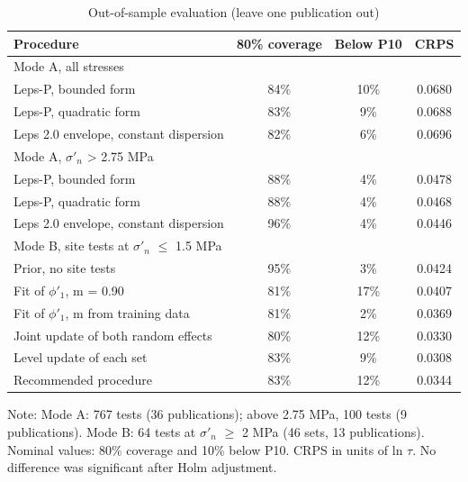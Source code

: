 \documentclass[Journal,letterpaper]{ascelike-new}
\begin{document}
\begin{table}
\caption{Out-of-sample evaluation (leave one publication out)}
\label{tab:2}
\centering\small
\renewcommand{\arraystretch}{1.15}
\begin{tabular}{lccc}
\hline\hline
Procedure & 80\% coverage & Below P10 & CRPS \\
\hline
Mode A, all stresses &  &  &  \\
   Leps-P, bounded form & 84\% & 10\% & 0.0680 \\
   Leps-P, quadratic form & 83\% & 9\% & 0.0688 \\
   Leps 2.0 envelope, constant dispersion & 82\% & 6\% & 0.0696 \\
Mode A, $\sigma'_n$ > 2.75 MPa &  &  &  \\
   Leps-P, bounded form & 88\% & 4\% & 0.0478 \\
   Leps-P, quadratic form & 88\% & 4\% & 0.0468 \\
   Leps 2.0 envelope, constant dispersion & 96\% & 4\% & 0.0446 \\
Mode B, site tests at $\sigma'_n$ $\le$ 1.5 MPa &  &  &  \\
   Prior, no site tests & 95\% & 3\% & 0.0424 \\
   Fit of $\phi'_1$, m = 0.90 & 81\% & 17\% & 0.0407 \\
   Fit of $\phi'_1$, m from training data & 81\% & 2\% & 0.0369 \\
   Joint update of both random effects & 80\% & 12\% & 0.0330 \\
   Level update of each set & 83\% & 9\% & 0.0308 \\
   Recommended procedure & 83\% & 12\% & 0.0344 \\
\hline\hline
\end{tabular}
\par\vspace{4pt}\parbox{\linewidth}{\footnotesize Note: Mode A: 767 tests (36 publications); above 2.75 MPa, 100 tests (9 publications). Mode B: 64 tests at $\sigma'_n$ $\ge$ 2 MPa (46 sets, 13 publications). Nominal values: 80\% coverage and 10\% below P10. CRPS in units of ln $\tau$. No difference was significant after Holm adjustment.}
\end{table}
\end{document}
